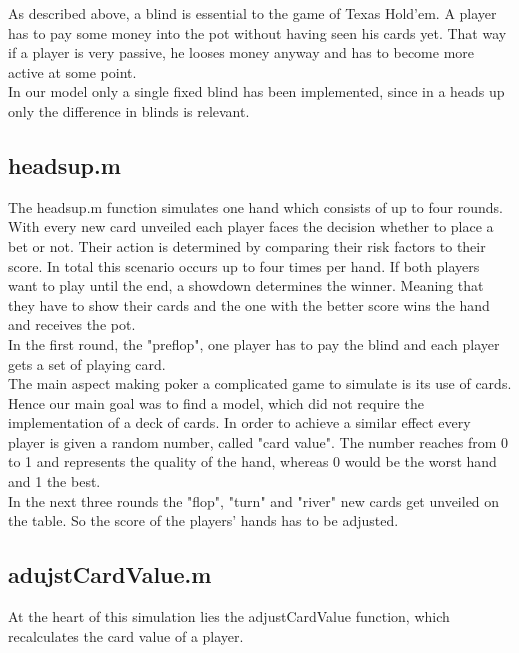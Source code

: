 \documentclass[11pt]{article}
\begin{document}
As described above, a blind is essential to the game of Texas Hold'em. A player has to pay some money into the pot without having seen his cards yet. That way if a player is very passive, he looses money anyway and has to become more active at some point. \\

In our model only a single fixed blind has been implemented, since in a heads up only the difference in blinds is relevant.

 

\subsection{headsup.m}

The headsup.m function simulates one hand which consists of up to four rounds. With every new card unveiled each player faces the decision whether to place a bet or not. Their action is determined by comparing their risk factors to their score. In total this scenario occurs up to four times per hand. If both players want to play until the end, a showdown determines the winner. Meaning that they have to show their cards and the one with the better score wins the hand and receives the pot.\\

In the first round, the "preflop", one player has to pay the blind and each player gets a set of playing card.\\

The main aspect making poker a complicated game to simulate is its use of cards. Hence our main goal was to find a model, which did not require the implementation of a deck of cards. In order to achieve a similar effect every player is given a random number, called "card value". The number reaches from 0 to 1 and represents the quality of the hand, whereas 0 would be the worst hand and 1 the best.\\

In the next three rounds the "flop", "turn" and "river" new cards get unveiled on the table. So the score of the players' hands has to be adjusted.

 

\subsection{adujstCardValue.m}

At the heart of this simulation lies the adjustCardValue function, which recalculates the card value of a player.\\
\end{document}
